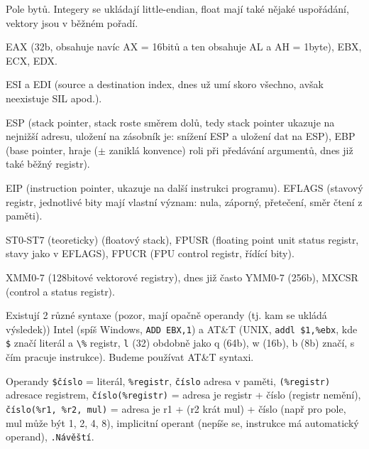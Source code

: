\documentclass[12pt]{article}                   %
\begin{document}
        \begin{definice}
            Pole bytů. Integery se ukládají little-endian, float mají také nějaké uspořádání, vektory jsou v běžném pořadí.
        \end{definice}

        \begin{definice}[Registry]
            EAX (32b, obsahuje navíc AX = 16bitů a ten obsahuje AL a AH = 1byte), EBX, ECX, EDX.

            ESI a EDI (source a destination index, dnes už umí skoro všechno, avšak neexistuje SIL apod.).

            ESP (stack pointer, stack roste směrem dolů, tedy stack pointer ukazuje na nejnižší adresu, uložení na zásobník je: snížení ESP a uložení dat na ESP), EBP (base pointer, hraje ($±$ zaniklá konvence) roli při předávání argumentů, dnes již také běžný registr).

            EIP (instruction pointer, ukazuje na další instrukci programu). EFLAGS (stavový registr, jednotlivé bity mají vlastní význam: nula, záporný, přetečení, směr čtení z paměti).

            ST0-ST7 (teoreticky) (floatový stack), FPUSR (floating point unit status registr, stavy jako v EFLAGS), FPUCR (FPU control registr, řídící bity).

            XMM0-7 (128bitové vektorové registry), dnes již často YMM0-7 (256b), MXCSR (control a status registr).
        \end{definice}

        \begin{definice}[Asembler]
            Existují 2 různé syntaxe (pozor, mají opačně operandy (tj. kam se ukládá výsledek)) Intel (spíš Windows, \verb|ADD EBX,1|) a AT\&T (UNIX, \verb|addl $1,%ebx|, kde \verb|$| značí literál a \verb|\%| registr, \verb|l| (32) obdobně jako q (64b), w (16b), b (8b) značí, s čím pracuje instrukce). Budeme používat AT\&T syntaxi.

            Operandy \verb|$číslo| = literál, \verb|%registr|, \verb|číslo| adresa v paměti, \verb|(%registr)| adresace registrem, \verb|číslo(%registr)| = adresa je registr + číslo (registr nemění), \verb|číslo(%r1, %r2, mul)| = adresa je r1 + (r2 krát mul) + číslo (např pro pole, mul může být 1, 2, 4, 8), implicitní operant (nepíše se, instrukce má automatický operand), \verb|.Návěští|.
        \end{definice}
\end{document}
